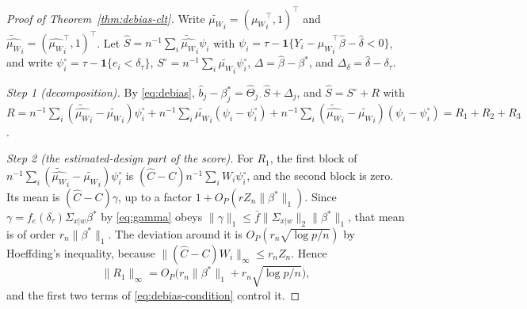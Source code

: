 \documentclass[12pt,a4paper]{article}
\theoremstyle{definition}
\theoremstyle{remark}
\newcommand{\ind}[1]{\mathbf{1}\{#1\}}
\newcommand{\betas}{\beta^*}
\newcommand{\muv}{\mu_W}
\newcommand{\Sxw}{\Sigma_{x|w}}
\newcommand{\Ccal}{C}
\begin{document}
\begin{proof}[Proof of Theorem~\ref{thm:debias-clt}]
Write ${\tilde{\muv}}_i=({\muv}_i^\top,1)^\top$ and
${\tilde{\hat{\muv}}}_i=({\hat{\muv}}_i^\top,1)^\top$. Let
$\hat S=n^{-1}\sum_i{\tilde{\hat{\muv}}}_i\psi_i$ with
$\psi_i=\tau-\ind{Y_i-{\hat{\muv}}_i^\top\hat\beta-\hat\delta<0}$, and write
$\psi_i^\circ=\tau-\ind{e_i<\delta_\tau}$,
$S^\circ=n^{-1}\sum_i{\tilde{\muv}}_i\psi_i^\circ$,
$\Delta=\hat\beta-\betas$, and $\Delta_\delta=\hat\delta-\delta_\tau$.

\emph{Step 1 (decomposition).} By \eqref{eq:debias},
$\hat b_j-\beta^*_j=\hat\Theta_{j\cdot}\hat S+\Delta_j$, and
$\hat S=S^\circ+R$ with
$R=n^{-1}\sum_i({\tilde{\hat{\muv}}}_i-{\tilde{\muv}}_i)\psi_i^\circ
+n^{-1}\sum_i{\tilde{\muv}}_i(\psi_i-\psi_i^\circ)
+n^{-1}\sum_i({\tilde{\hat{\muv}}}_i-{\tilde{\muv}}_i)(\psi_i-\psi_i^\circ)
=R_1+R_2+R_3$.

\emph{Step 2 (the estimated-design part of the score).} For $R_1$, the first block of$n^{-1}\sum_i({\tilde{\hat{\muv}}}_i-{\tilde{\muv}}_i)\psi_i^\circ$ is
$(\hat\Ccal-\Ccal)n^{-1}\sum_iW_i\psi_i^\circ$, and the second block is zero. Its mean is
$(\hat\Ccal-\Ccal)\gamma$, up to a factor $1+O_P(rZ_n\|\betas\|_1)$. Since
$\gamma=f_e(\delta_\tau)\Sxw\betas$ by \eqref{eq:gamma} obeys
$\|\gamma\|_1\le\bar f\|\Sxw\|_2\|\betas\|_1$, that mean is of order
$r_n\|\betas\|_1$. The deviation around it is $O_P(r_n\sqrt{\log p/n})$ by Hoeffding's
inequality, because $\|(\hat\Ccal-\Ccal)W_i\|_\infty\le r_nZ_n$. Hence
\[
\|R_1\|_\infty=O_P\big(r_n\|\betas\|_1+r_n\sqrt{\log p/n}\big),
\]
and the first two terms of \eqref{eq:debias-condition} control it.


\end{proof}
\end{document}
